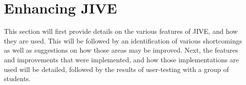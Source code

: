 \chapter{Enhancing JIVE}\label{jiveEnhance}

This section will first provide details on the various features of JIVE, and how they are used.
This will be followed by an identification of various shortcomings as well as suggestions on how those areas may be improved.
Next, the features and improvements that were implemented, and how those implementations are used will be detailed, followed by the results of user-testing with a group of students.






